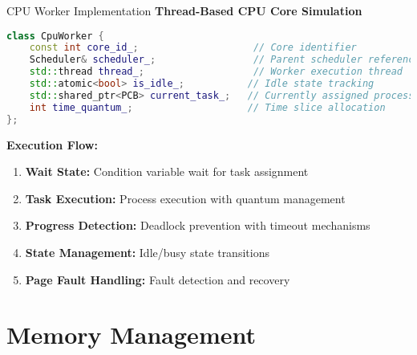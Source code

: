 \documentclass[10pt]{beamer}
\begin{document}
\begin{frame}[fragile]{CPU Worker Implementation}
    \textbf{Thread-Based CPU Core Simulation}
    \begin{lstlisting}[language=C++]
class CpuWorker {
    const int core_id_;                    // Core identifier
    Scheduler& scheduler_;                 // Parent scheduler reference
    std::thread thread_;                   // Worker execution thread
    std::atomic<bool> is_idle_;           // Idle state tracking
    std::shared_ptr<PCB> current_task_;   // Currently assigned process
    int time_quantum_;                    // Time slice allocation
};
    \end{lstlisting}
    
    \vspace{0.3cm}
    \textbf{Execution Flow:}
    \begin{enumerate}
        \item \textbf{Wait State:} Condition variable wait for task assignment
        \item \textbf{Task Execution:} Process execution with quantum management
        \item \textbf{Progress Detection:} Deadlock prevention with timeout mechanisms
        \item \textbf{State Management:} Idle/busy state transitions
        \item \textbf{Page Fault Handling:} Fault detection and recovery
    \end{enumerate}
\end{frame}

\section{Memory Management}
\end{document}
